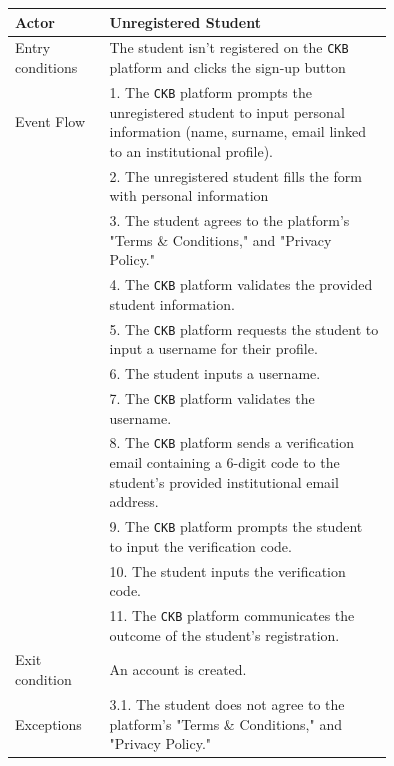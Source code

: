 \begin{center}
    \begin{longtable}{lp{0.75\linewidth}}
        \hline
        Actor            & Unregistered Student                                                                                                                                                                               \\
        \hline
        Entry conditions & The student isn't registered on the \verb|CKB| platform and clicks the sign-up button                                                                                                               \\
        \hline
        Event Flow       
        & 1. The \verb|CKB| platform prompts the unregistered student to input personal information (name, surname, email linked to an institutional profile).\\
        & 2. The unregistered student fills the form with personal information\\
        & 3. The student agrees to the platform's "Terms \& Conditions," and "Privacy Policy."\\
        & 4. The \verb|CKB| platform validates the provided student information.\\
        & 5. The \verb|CKB| platform requests the student to input a username for their profile.\\
        & 6. The student inputs a username.\\ 
        & 7. The \verb|CKB| platform validates the username.\\
        & 8. The \verb|CKB| platform sends a verification email containing a 6-digit code to the student's provided institutional email address.\\
        & 9. The \verb|CKB| platform prompts the student to input the verification code.\\
        & 10. The student inputs the verification code.\\
        & 11. The \verb|CKB| platform communicates the outcome of the student's registration.\\
        \hline
        Exit condition   & An account is created.   \\                                                                                                                                                                           
        \hline
        Exceptions   
        & 3.1. The student does not agree to the platform's "Terms \& Conditions," and "Privacy Policy."\\

\end{longtable}
\end{center}
